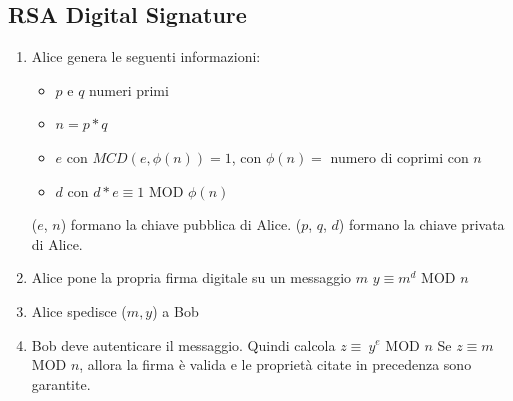 \documentclass[12pt]{report}
\begin{document}
\subsection{RSA Digital Signature}
\begin{enumerate}[topsep=5pt, itemsep=0pt]
    \item Alice genera le seguenti informazioni:
        \begin{itemize}[topsep=-2pt, itemsep=0pt, label={$-$}]
            \item \(p\) e \(q\) numeri primi
            \item \(n = p * q\)
            \item \(e\) con \(MCD(e, \phi(n)) = 1\), con \(\phi(n) =\) numero di coprimi con \(n\)
            \item \(d\) con \(d * e \equiv 1\) MOD \(\phi(n)\)
        \end{itemize}
        (\(e\), \(n\)) formano la chiave pubblica di Alice.\newline
        (\(p\), \(q\), \(d\)) formano la chiave privata di Alice.
    \item Alice pone la propria firma digitale su un messaggio \(m\)\newline
    \(y \equiv m^d\) MOD \(n\)
    \item Alice spedisce (\(m,y\)) a Bob
    \item Bob deve autenticare il messaggio. Quindi calcola \(z \equiv\ y^e\) MOD \(n\)\newline
    Se \(z \equiv m\) MOD \(n\), allora la firma è valida e le proprietà citate in precedenza sono garantite. \cite{Sette}
\end{enumerate}\newpage
\end{document}
